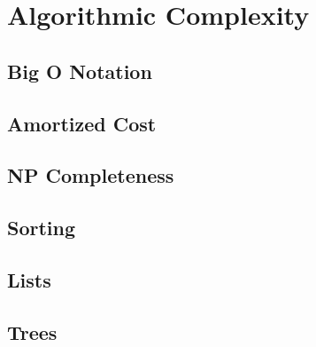 \section{Algorithmic Complexity}

\subsection{Big O Notation}

\subsection{Amortized Cost}

\subsection{NP Completeness}

\subsection{Sorting}

\subsection{Lists}

\subsection{Trees}

